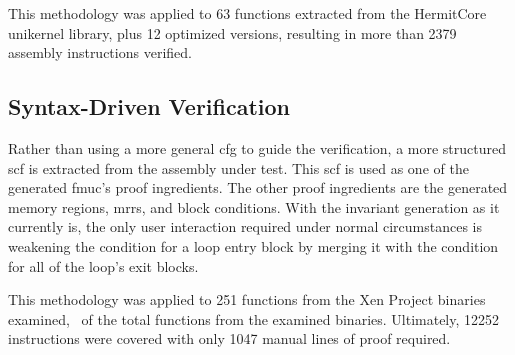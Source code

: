 This methodology was applied to \num{63} functions
extracted from the HermitCore unikernel library, plus \num{12} optimized versions,
resulting in more than \num{2379} assembly instructions verified.

\subsection{Syntax-Driven Verification}
Rather than using a more general \ac{cfg} to guide the verification,
a more structured \ac{scf} is extracted from the assembly under test.
This \ac{scf} is used as one of the generated \ac{fmuc}'s proof ingredients.
The other proof ingredients are the generated memory regions,
\acp{mrr}, and block conditions.
With the invariant generation as it currently is,
the only user interaction required under normal circumstances
is weakening the condition for a loop entry block
by merging it with the condition for all of the loop's exit blocks.

This methodology was applied to 251 functions from the Xen Project binaries examined,
\xenpercentage\ of the total functions from the examined binaries.
Ultimately, \num{12252} instructions were covered
with only \num{1047} manual lines of proof required.

